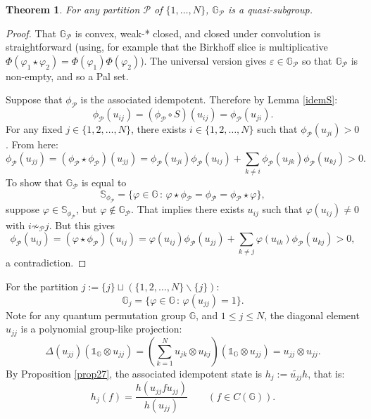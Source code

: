 \documentclass[12pt]{amsart}
\newtheorem{theorem}{Theorem}[section]
\theoremstyle{remark}
\theoremstyle{remark}
\begin{document}
\begin{theorem}
For any partition $\mathcal{P}$ of $\{1,\dots,N\}$, $\mathbb{G}_{\mathcal{P}}$ is a quasi-subgroup.
\end{theorem}
\begin{proof}
That $\mathbb{G}_{\mathcal{P}}$ is convex, weak-* closed, and closed under convolution is straightforward (using, for example that the Birkhoff slice is multiplicative $\Phi(\varphi_1\star \varphi_2)=\Phi(\varphi_1)\Phi(\varphi_2)$). The universal version gives $\varepsilon\in \mathbb{G}_{\mathcal{P}}$ so that $\mathbb{G}_{\mathcal{P}}$ is non-empty, and so a Pal set.

\bigskip

Suppose that $\phi_{\mathcal{P}}$ is the associated idempotent. Therefore by Lemma \ref{idemS}:
$$\phi_{\mathcal{P}}(u_{ij})=(\phi_{\mathcal{P}}\circ S)(u_{ij})=\phi_{\mathcal{P}}(u_{ji}).$$ For any fixed $j\in \{1,2,\dots,N\}$, there exists $i\in \{1,2,\dots,N\}$ such that $\phi_{\mathcal{P}}(u_{ji})>0$. From here:
$$\phi_{\mathcal{P}}(u_{jj})=(\phi_{\mathcal{P}}\star \phi_{\mathcal{P}})(u_{jj})=\phi_{\mathcal{P}}(u_{ji})\phi_{\mathcal{P}}(u_{ij})+\sum_{k\neq i}\phi_{\mathcal{P}}(u_{jk})\phi_{\mathcal{P}}(u_{kj})>0.$$
 To show that $\mathbb{G}_{\mathcal{P}}$ is equal to
 $$\mathbb{S}_{\phi_{\mathcal{P}}}=\{\varphi\in\mathbb{G}\,\colon\,\varphi\star \phi_{\mathcal{P}}=\phi_{\mathcal{P}}=\phi_{\mathcal{P}}\star \varphi \},$$ suppose $\varphi\in \mathbb{S}_{\phi_{\mathcal{P}}}$, but $\varphi\not\in \mathbb{G}_{\mathcal{P}}$. That implies there exists $u_{ij}$ such that $\varphi(u_{ij})\neq 0$ with $i\not\sim_{\mathcal{P}}j$. But this gives
$$\phi_{\mathcal{P}}(u_{ij})=(\varphi\star\phi_{\mathcal{P}})(u_{ij})=\varphi(u_{ij})\phi_{\mathcal{P}}(u_{jj})+\sum_{k\neq j}\varphi(u_{ik})\phi_{\mathcal{P}}(u_{kj})>0,$$
a contradiction.
\end{proof}

For the partition $j:=\{j\}\sqcup(\{1,2,\dots,N\}\backslash \{j\})$:
$$\mathbb{G}_{j}=\{\varphi\in \mathbb{G}\,\colon\, \varphi(u_{jj})=1\}.$$
Note for any quantum permutation group $\mathbb{\mathbb{G}}$, and $1\leq j\leq N$, the diagonal element $u_{jj}$ is a polynomial group-like projection:
$$\Delta(u_{jj})(\mathds{1}_{\mathbb{G}}\otimes u_{jj})=\left(\sum_{k=1}^Nu_{jk}\otimes u_{kj}\right)(\mathds{1}_{\mathbb{G}}\otimes u_{jj})=u_{jj}\otimes u_{jj}.$$
By Proposition \ref{prop27},  the associated idempotent state is $h_j:=\widetilde{u_{jj}}h$, that is:
$$h_j(f)=\frac{h(u_{jj}fu_{jj})}{h(u_{jj})}\qquad(f\in C(\mathbb{G})).$$
\end{document}
